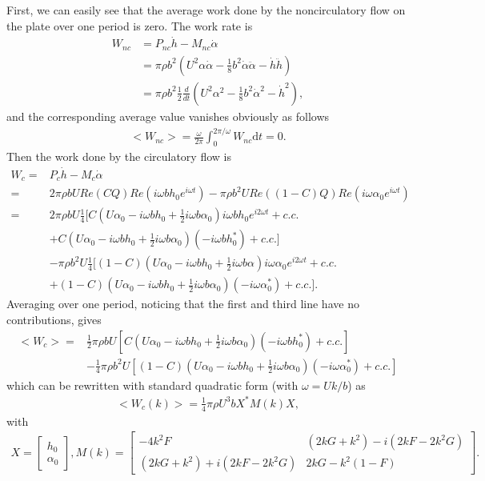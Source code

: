 First, we can easily see that the average work done by the noncirculatory flow on the plate over one period is zero. 
The work rate is
\begin{align}
W_{nc} & =  P_{nc} \dot{h} - M_{nc} \dot{\alpha}  \\
       & =  \pi \rho b^2 (U^2 \alpha \dot{\alpha} - \frac{1}{8} b^2 \dot{\alpha} \ddot{\alpha} - \dot{h} \ddot{h})  \\
       & =  \pi \rho b^2 \frac{1}{2} \frac{d}{dt} (U^2 {\alpha}^2 - \frac{1}{8} b^2 {\dot{\alpha}}^2 - {\dot{h}}^2 ),
\end{align}
and the corresponding average value vanishes obviously as follows
\begin{align}
<W_{nc}> = \frac{\omega}{2\pi} \int_{0}^{2\pi/\omega} W_{nc} \mathrm{d}t = 0.
\end{align}
Then the work done by the circulatory flow is
\begin{align}
W_{c}   = & P_{c} \dot{h} - M_{c} \dot{\alpha}  \\
         = & 2\pi \rho b U Re(CQ) Re(i \omega bh_0 e^{i\omega t}) - \pi \rho b^2 U Re( (1 - C)Q ) Re( i \omega \alpha_0 e^{i\omega t} )  \\
     = & 2\pi \rho b U \frac{1}{4} [ C(U\alpha_0 - i \omega bh_0 + \frac{1}{2} i \omega b\alpha_0) i \omega bh_0 e^{i2\omega t} + c.c. \\
       &  + C(U \alpha_0 - i \omega bh_0 + \frac{1}{2} i\omega b\alpha_0) (-i \omega b h_0^{*}) + c.c.]  \\
       &  - \pi \rho b^2 U \frac{1}{4} [ (1 - C) (U \alpha_0 - i \omega b h_0 + \frac{1}{2} i\omega b\alpha) i\omega \alpha_0 e^{i2\omega t} + c.c. \\
       &   + (1 - C) (U \alpha_0 - i \omega bh_0 + \frac{1}{2} i\omega b\alpha_0) (-i\omega \alpha_0^{*}) + c.c.].
\end{align}
Averaging over one period, noticing that the first and third line have no contributions, gives 
\begin{align}
<W_{c}>  = & \frac{1}{2} \pi \rho b U [C(U \alpha_0 - i \omega bh_0 + \frac{1}{2} i\omega b \alpha_0) (-i \omega b h_0^{*}) + c.c.]     \\
                                  & - \frac{1}{4} \pi \rho b^2 U [(1 - C) (U \alpha_0 - i \omega bh_0 + \frac{1}{2} i\omega b\alpha_0) (-i\omega \alpha_0^{*}) + c.c.]
\end{align}
which can be rewritten with standard quadratic form (with $\omega = Uk/b$) as
\begin{align}
<W_{c}(k)>  = \frac{1}{4}{\pi \rho U^3 b} X^* M(k) X,
\end{align}
with
\begin{align}
X =  \begin{bmatrix} h_0  \\  \alpha_0   \end{bmatrix},
M(k) = \begin{bmatrix}   -4k^2 F   &  (2kG+k^2) - i(2kF - 2k^2G)  \\
                         (2kG+k^2) + i(2kF - 2k^2G)  &   2kG - k^2(1 - F)  \end{bmatrix}.
\end{align}

